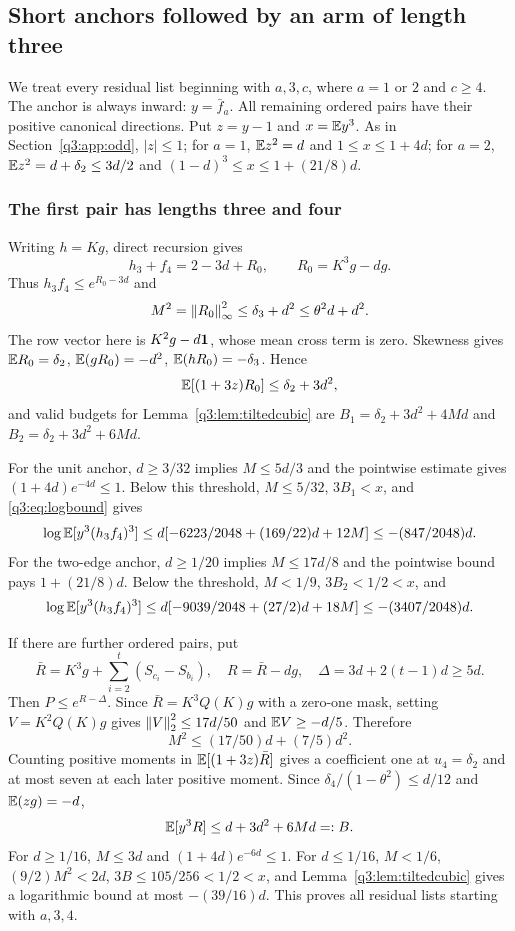 \subsection{Short anchors followed by an arm of length three}\label{q3:app:prefix}
We treat every residual list beginning with $a,3,c$, where $a=1$ or $2$ and $c\ge4$. The anchor is always inward: $y=\bar f_a$. All remaining ordered pairs have their positive canonical directions. Put $z=y-1$ and $x=\mathbb E y^3$. As in Section~\ref{q3:app:odd}, $|z|\le1$; for $a=1$, $\mathbb E z^2=d$ and $1\le x\le1+4d$; for $a=2$, $\mathbb E z^2=d+\delta_{2}\le3d/2$ and $(1-d)^3\le x\le1+(21/8)d$.

\subsubsection{The first pair has lengths three and four}
Writing $h=Kg$, direct recursion gives
\[
 h_3+f_4=2-3d+R_0,\qquad R_0=K^3g-dg.
\]
Thus $h_3f_4\le e^{R_0-3d}$ and
\[
 M^2=\left\lVert R_0\right\rVert_\infty^2\le \delta_{3}+d^2\le\theta^2d+d^2.
\]
The row vector here is $K^2g-d\mathbf1$, whose mean cross term is zero. Skewness gives
$\mathbb E R_0=\delta_{2}$, $\mathbb E(gR_0)=-d^2$, $\mathbb E(hR_0)=-\delta_{3}$. Hence
\[
 \mathbb E[(1+3z)R_0]\le \delta_{2}+3d^2,
\]
and valid budgets for Lemma~\ref{q3:lem:tiltedcubic} are
$B_1=\delta_{2}+3d^2+4Md$ and $B_2=\delta_{2}+3d^2+6Md$.

For the unit anchor, $d\ge3/32$ implies $M\le5d/3$ and the pointwise estimate gives $(1+4d)e^{-4d}\le1$. Below this threshold, $M\le5/32$, $3B_1<x$, and \eqref{q3:eq:logbound} gives
\[
 \log\mathbb E[y^3(h_3f_4)^3]
 \le d[-6223/2048+(169/22)d+12M]\le-(847/2048)d.
\]
For the two-edge anchor, $d\ge1/20$ implies $M\le17d/8$ and the pointwise bound pays $1+(21/8)d$. Below the threshold, $M<1/9$, $3B_2<1/2<x$, and
\[
 \log\mathbb E[y^3(h_3f_4)^3]
 \le d[-9039/2048+(27/2)d+18M]\le-(3407/2048)d.
\]

If there are further ordered pairs, put
\[
 \bar R=K^3g+\sum_{i=2}^t(S_{c_i}-S_{b_i}),\quad
 R=\bar R-dg,\quad \Delta=3d+2(t-1)d\ge5d .
\]
Then $P\le e^{R-\Delta}$. Since $\bar R=K^3Q(K)g$ with a zero-one mask, setting $V=K^2Q(K)g$ gives $\left\lVert V\right\rVert_2^2\le17d/50$ and $\mathbb E V\ge-d/5$. Therefore
\[
 M^2\le(17/50)d+(7/5)d^2.
\]
Counting positive moments in $\mathbb E[(1+3z)\bar R]$ gives a coefficient one at $u_4=\delta_{2}$ and at most seven at each later positive moment. Since $\delta_{4}/(1-\theta^2)\le d/12$ and $\mathbb E(zg)=-d$,
\[
 \mathbb E[y^3R]\le d+3d^2+6Md=:B.
\]
For $d\ge1/16$, $M\le3d$ and $(1+4d)e^{-6d}\le1$. For $d\le1/16$, $M<1/6$, $(9/2)M^2<2d$, $3B\le105/256<1/2<x$, and Lemma~\ref{q3:lem:tiltedcubic} gives a logarithmic bound at most $-(39/16)d$. This proves all residual lists starting with $a,3,4$.

